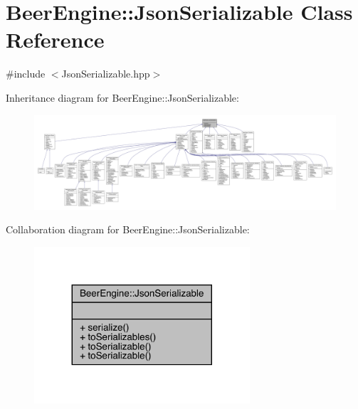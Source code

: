 \hypertarget{class_beer_engine_1_1_json_serializable}{}\section{Beer\+Engine\+:\+:Json\+Serializable Class Reference}
\label{class_beer_engine_1_1_json_serializable}


{\ttfamily \#include $<$Json\+Serializable.\+hpp$>$}



Inheritance diagram for Beer\+Engine\+:\+:Json\+Serializable\+:\nopagebreak
\begin{figure}[H]
\begin{center}
\leavevmode
\includegraphics[width=350pt]{class_beer_engine_1_1_json_serializable__inherit__graph}
\end{center}
\end{figure}


Collaboration diagram for Beer\+Engine\+:\+:Json\+Serializable\+:\nopagebreak
\begin{figure}[H]
\begin{center}
\leavevmode
\includegraphics[width=227pt]{class_beer_engine_1_1_json_serializable__coll__graph}
\end{center}
\end{figure}
